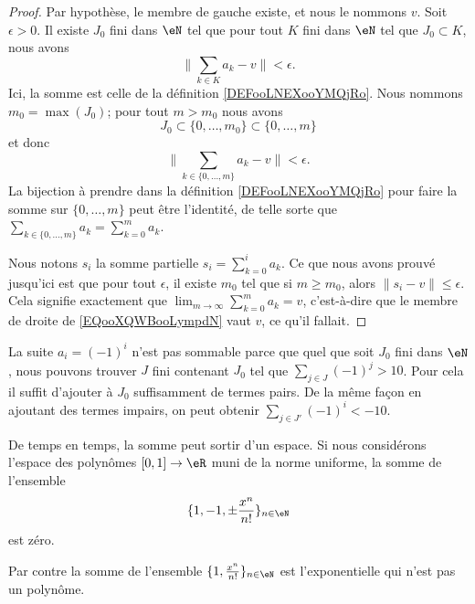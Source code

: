 \begin{proof}
	Par hypothèse, le membre de gauche existe, et nous le nommons \( v\). Soit \( \epsilon>0\). Il existe \( J_0\) fini dans \( \eN\) tel que pour tout \( K\) fini dans \( \eN\) tel que \( J_0\subset K\), nous avons
	\begin{equation}
		\| \sum_{k\in K}a_k-v \|<\epsilon.
	\end{equation}
	Ici, la somme est celle de la définition \ref{DEFooLNEXooYMQjRo}. Nous nommons \( m_0=\max(J_0)\); pour tout \( m>m_0\) nous avons
	\begin{equation}
		J_0\subset \{ 0,\ldots,m_0 \}\subset\{ 0,\ldots,m \}
	\end{equation}
	et donc
	\begin{equation}
		\| \sum_{k\in \{ 0,\ldots,m \}}a_k-v \|<\epsilon.
	\end{equation}
	La bijection à prendre dans la définition \eqref{DEFooLNEXooYMQjRo} pour faire la somme sur \( \{ 0,\ldots,m \}\) peut être l'identité, de telle sorte que \( \sum_{k\in\{ 0,\ldots,m \}}a_k=\sum_{k=0}^ma_k\).

	Nous notons \( s_i\) la somme partielle \( s_i=\sum_{k=0}^ia_k\). Ce que nous avons prouvé jusqu'ici est que pour tout \( \epsilon\), il existe \( m_0\) tel que si \( m\geq m_0\), alors \( \| s_i-v \|\leq \epsilon\). Cela signifie exactement que \( \lim_{m\to\infty}\sum_{k=0}^ma_k=v\), c'est-à-dire que le membre de droite de \eqref{EQooXQWBooLympdN} vaut \( v\), ce qu'il fallait.
\end{proof}

\begin{example}
	La suite \( a_i=(-1)^i\) n'est pas sommable parce que quel que soit \( J_0\) fini dans \( \eN\), nous pouvons trouver \( J\) fini contenant \( J_0\) tel que \( \sum_{j\in J}(-1)^j>10\). Pour cela il suffit d'ajouter à \( J_0\) suffisamment de termes pairs. De la même façon en ajoutant des termes impairs, on peut obtenir \( \sum_{j\in J'}(-1)^i<-10\).
\end{example}

\begin{example}
	De temps en temps, la somme peut sortir d'un espace. Si nous considérons l'espace des polynômes \( \mathopen[ 0 , 1 \mathclose]\to \eR\) muni de la norme uniforme, la somme de l'ensemble
	\begin{equation}
		\{ 1,-1,\pm\frac{ x^n }{ n! } \}_{n\in \eN}
	\end{equation}
	est zéro.

	Par contre la somme de l'ensemble \( \{ 1,\frac{ x^n }{ n! } \}_{n\in \eN}\) est l'exponentielle qui n'est pas un polynôme.
\end{example}

